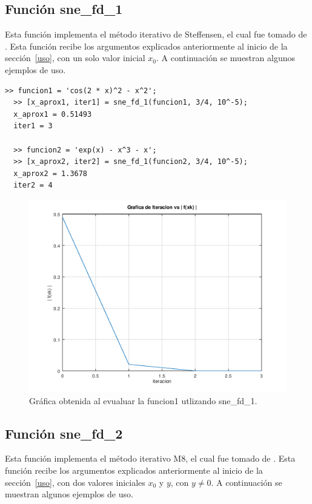 \documentclass[12pt]{article}
\begin{document}
\subsection{Función sne\_fd\_1}
Esta función implementa el método iterativo de Steffensen, el cual fue tomado de \cite{cordero2011class}. Esta función recibe los argumentos explicados anteriormente al inicio de la sección~\ref{uso}, con un solo valor inicial $x_{0}$. A continuación se muestran algunos ejemplos de uso.

\begin{minipage}{\linewidth}
\begin{lstlisting}[frame = single]
  >> funcion1 = 'cos(2 * x)^2 - x^2';
  >> [x_aprox1, iter1] = sne_fd_1(funcion1, 3/4, 10^-5);
  x_aprox1 = 0.51493
  iter1 = 3

  >> funcion2 = 'exp(x) - x^3 - x';
  >> [x_aprox2, iter2] = sne_fd_1(funcion2, 3/4, 10^-5);
  x_aprox2 = 1.3678
  iter2 = 4

\end{lstlisting}
\end{minipage}

\begin{figure}
  \includegraphics[width=12cm]{sne_fd_1_octave.png}
  \centering
  \caption{Gráfica obtenida al evualuar la funcion1 utlizando sne\_fd\_1.}
  \label{fig:stf-1}
\end{figure}


\subsection{Función sne\_fd\_2}
Esta función implementa el método iterativo M8, el cual fue tomado de \cite{bakhtiari2017widening}. Esta función recibe los argumentos explicados anteriormente al inicio de la sección~\ref{uso}, con dos valores iniciales $x_{0}$ y $y$, con $y \neq 0$. A continuación se muestran algunos ejemplos de uso.
\end{document}
